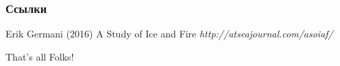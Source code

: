 \documentclass{beamer}
\begin{document}
\begin{frame}
\frametitle{Ссылки}
\footnotesize{
\begin{thebibliography}{99}

 Erik Germani (2016)
\newblock A Study of Ice and Fire
\newblock \emph{http://atseajournal.com/asoiaf/}



\end{thebibliography}
}
\end{frame}


\begin{frame}
\Huge{\centerline{That's all Folks!}}
\end{frame}

\end{document}
